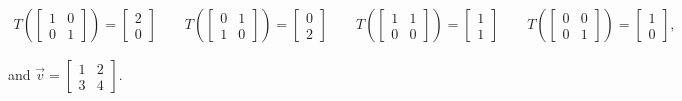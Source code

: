 \documentclass{article}
\begin{document}
\begin{align*}
	T\left(\left[\begin{array}{cc} 1& 0 \\ 0& 1 \end{array}\right]\right) = \left[\begin{array}{c} 2 \\ 0 \end{array}\right] \qquad T\left(\left[\begin{array}{cc} 0& 1 \\ 1& 0 \end{array}\right]\right) = \left[\begin{array}{c} 0 \\ 2 \end{array}\right] \qquad T\left(\left[\begin{array}{cc} 1& 1 \\ 0& 0 \end{array}\right]\right) = \left[\begin{array}{c} 1 \\ 1 \end{array}\right] \qquad T\left(\left[\begin{array}{cc} 0& 0 \\ 0& 1 \end{array}\right]\right) = \left[\begin{array}{c} 1 \\ 0 \end{array}\right],
\end{align*}

and $\vec{v} = \left[\begin{array}{cc} 1& 2 \\ 3& 4 \end{array}\right]$.
\end{document}
